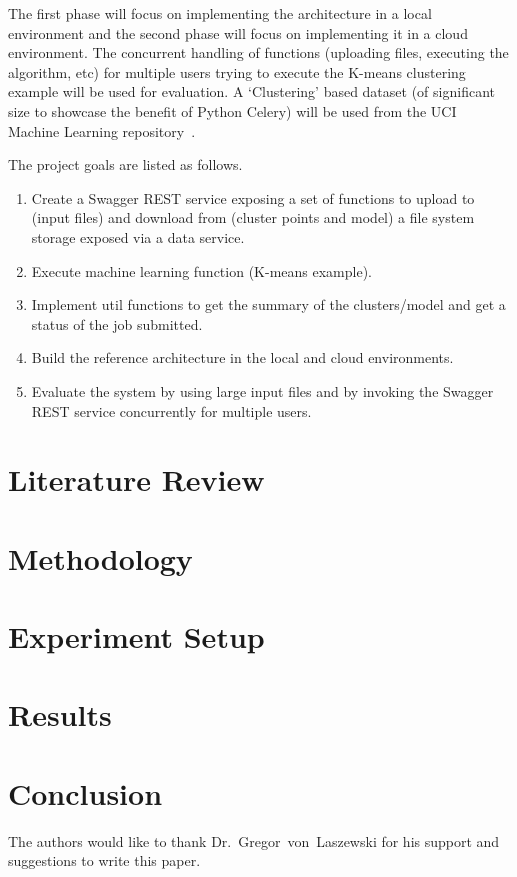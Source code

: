 The first phase will focus on implementing the architecture in a local 
environment and the second phase will focus on implementing it in a cloud 
environment. The concurrent handling of functions (uploading files, executing 
the algorithm, etc) for multiple users trying to execute the K-means clustering 
example will be used for evaluation. A `Clustering' based dataset (of 
significant size to showcase the benefit of Python Celery) will be used from 
the UCI Machine Learning repository~\cite{hid-sp18-416-www-uci-ml-repository}. 

The project goals are listed as follows.
\begin{enumerate}
	\item Create a Swagger REST service exposing a set of functions to upload 
	to (input files) and download from (cluster points and model) a file system 
	storage exposed via a data service.
	\item Execute machine learning function (K-means example).
	\item Implement util functions to get the summary of the clusters/model and 
	get a status of the job submitted.
	\item Build the reference architecture in the local and cloud environments.
	\item Evaluate the system by using large input files and by invoking the 
	Swagger REST service concurrently for multiple users.
\end{enumerate}

\section{Literature Review}

\section{Methodology}

\section{Experiment Setup}

\section{Results}

\section{Conclusion}


\begin{acks}

  The authors would like to thank Dr.~Gregor~von~Laszewski for his
  support and suggestions to write this paper.

\end{acks}


 

